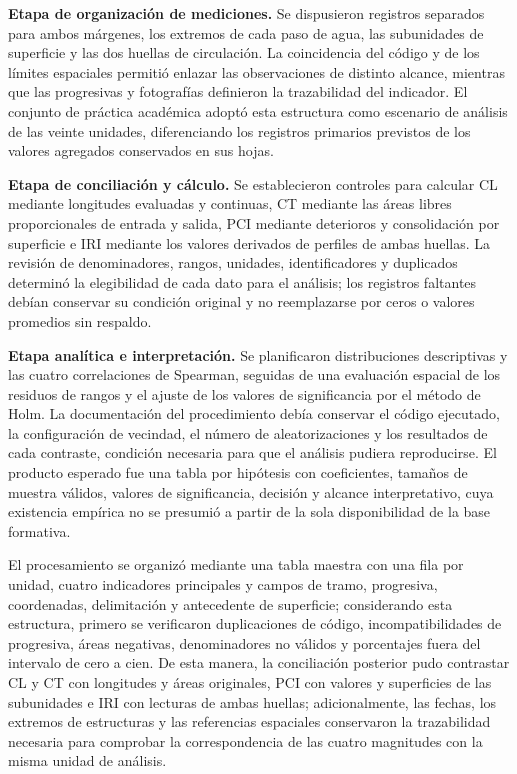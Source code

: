 \textbf{Etapa de organización de mediciones.} Se dispusieron registros separados para ambos márgenes, los extremos de cada paso de agua, las subunidades de superficie y las dos huellas de circulación. La coincidencia del código y de los límites espaciales permitió enlazar las observaciones de distinto alcance, mientras que las progresivas y fotografías definieron la trazabilidad del indicador. El conjunto de práctica académica adoptó esta estructura como escenario de análisis de las veinte unidades, diferenciando los registros primarios previstos de los valores agregados conservados en sus hojas.

\textbf{Etapa de conciliación y cálculo.} Se establecieron controles para calcular CL mediante longitudes evaluadas y continuas, CT mediante las áreas libres proporcionales de entrada y salida, PCI mediante deterioros y consolidación por superficie e IRI mediante los valores derivados de perfiles de ambas huellas. La revisión de denominadores, rangos, unidades, identificadores y duplicados determinó la elegibilidad de cada dato para el análisis; los registros faltantes debían conservar su condición original y no reemplazarse por ceros o valores promedios sin respaldo.

\textbf{Etapa analítica e interpretación.} Se planificaron distribuciones descriptivas y las cuatro correlaciones de Spearman, seguidas de una evaluación espacial de los residuos de rangos y el ajuste de los valores de significancia por el método de Holm. La documentación del procedimiento debía conservar el código ejecutado, la configuración de vecindad, el número de aleatorizaciones y los resultados de cada contraste, condición necesaria para que el análisis pudiera reproducirse. El producto esperado fue una tabla por hipótesis con coeficientes, tamaños de muestra válidos, valores de significancia, decisión y alcance interpretativo, cuya existencia empírica no se presumió a partir de la sola disponibilidad de la base formativa.


El procesamiento se organizó mediante una tabla maestra con una fila por unidad, cuatro indicadores principales y campos de tramo, progresiva, coordenadas, delimitación y antecedente de superficie; considerando esta estructura, primero se verificaron duplicaciones de código, incompatibilidades de progresiva, áreas negativas, denominadores no válidos y porcentajes fuera del intervalo de cero a cien. De esta manera, la conciliación posterior pudo contrastar CL y CT con longitudes y áreas originales, PCI con valores y superficies de las subunidades e IRI con lecturas de ambas huellas; adicionalmente, las fechas, los extremos de estructuras y las referencias espaciales conservaron la trazabilidad necesaria para comprobar la correspondencia de las cuatro magnitudes con la misma unidad de análisis.

